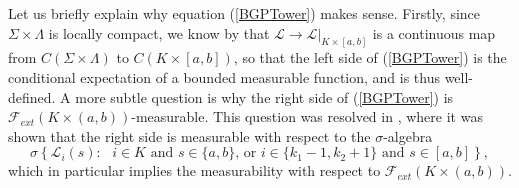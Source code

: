 \begin{remark}\label{RemMeas} Let us briefly explain why equation (\ref{BGPTower}) makes sense. Firstly, since $\Sigma \times \Lambda$ is locally compact, we know by \cite[Lemma 46.4]{Munkres} that $\mathcal{L} \rightarrow \mathcal{L}|_{K \times [a,b]}$ is a continuous map from $C(\Sigma \times \Lambda)$ to $C(K \times [a,b])$, so that the left side of (\ref{BGPTower}) is the conditional expectation of a bounded measurable function, and is thus well-defined. A more subtle question is why the right side of (\ref{BGPTower})  is $\mathcal{F}_{ext} (K \times (a,b))$-measurable. This question was resolved in \cite[Lemma 3.4]{DimMat}, where it was shown that the right side is measurable with respect to the $\sigma$-algebra 
$$ \sigma \left\{ \mathcal{L}_i(s) : \mbox{  $i \in K$ and $s \in \{a,b\}$, or $i \in \{k_1 - 1, k_2 +1 \}$ and $s \in [a,b]$} \right\},$$
which in particular implies the measurability with respect to $\mathcal{F}_{ext} (K \times (a,b))$.
\end{remark}

